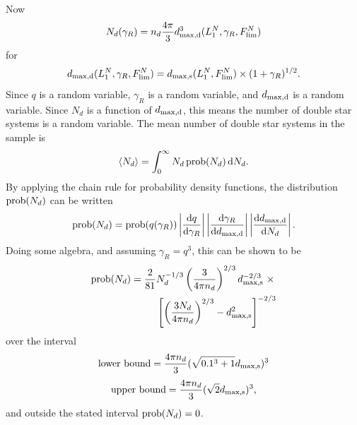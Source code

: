 \documentclass{emulateapj}
\begin{document}
Now
\begin{equation}
N_d(\gamma_R) = n_d \frac{4\pi}{3} d_{\rm max,d}^3(L_1^N, \gamma_R, F_{\rm 
lim}^N)
\end{equation}
for
\begin{equation}
d_{\rm max,d}(L_1^N, \gamma_R, F_{\rm lim}^N) =
d_{\rm max,s}(L_1^N, F_{\rm lim}^N)\times (1+\gamma_R)^{1/2}.
\end{equation}
Since $q$ is a random variable, $\gamma_R$ is a random variable, and $d_{\rm 
max,d}$ is a random variable. Since $N_d$ is a function of $d_{\rm max,d}$, 
this means the number of double star systems is a random variable.
The mean number of double star systems in the sample is
\begin{equation}
\langle N_d \rangle = \int_{0}^{\infty} N_d\, {\rm prob}(N_d) \,{\rm d}N_d.
\end{equation}
By applying the chain rule for probability density functions, the distribution 
${\rm prob}(N_d)$ can be written 
\begin{equation}
{\rm prob}(N_d) = {\rm prob}(q(\gamma_R)) 
	  \left| \frac{{\rm d}q}{{\rm d}\gamma_R}  \right|
	  \left| \frac{{\rm d}\gamma_R}{{\rm d}d_{\rm max,d}}  \right|				
	  \left| \frac{{\rm d}d_{\rm max,d}}{{\rm d}N_d}  \right|.
\end{equation}
Doing some algebra, and assuming $\gamma_R = q^3$, this can be shown to be
\begin{align}
{\rm prob}(N_d) = \frac{2}{81} &N_d^{-1/3} \left(\frac{3}{4\pi 
n_d}\right)^{2/3} d_{\rm max,s}^{-2/3} \ \times \nonumber\\
&\left[ \left(\frac{3 N_d}{4\pi n_d}\right)^{2/3} - d_{\rm 
max,s}^2 \right]^{-2/3}
\end{align}
over the interval
\begin{equation}
{\rm lower\ bound} = \frac{4 \pi n_d}{3} (\sqrt{0.1^3 + 1} d_{\rm max,s})^3
\end{equation}
\begin{equation}
{\rm upper\ bound} = \frac{4 \pi n_d}{3} (\sqrt{2}d_{\rm max,s})^3,
\end{equation}
and outside the stated interval ${\rm prob}(N_d) = 0$.
\end{document}
